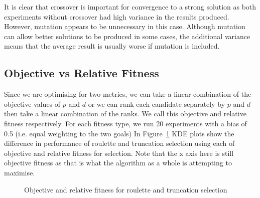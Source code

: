 It is clear that crossover is important for convergence to a strong solution as both experiments without crossover had high variance in the results produced. However, mutation appears to be unnecessary in this case. Although mutation can allow better solutions to be produced in some cases, the additional variance means that the average result is usually worse if mutation is included. 

\subsection{Objective vs Relative Fitness}

Since we are optimising for two metrics, we can take a linear combination of the objective values of $p$ and $d$ or we can rank each candidate separately by $p$ and $d$ then take a linear combination of the ranks. We call this objective and relative fitness respectively. For each fitness type, we run 20 experiments with a bias of 0.5 (i.e. equal weighting to the two goals) In Figure~\ref{fig:objective} KDE plots show the difference in performance of roulette and truncation selection using each of objective and relative fitness for selection. Note that the x axis here is still objective fitness as that is what the algorithm as a whole is attempting to maximise.

\begin{figure}[!h]
\centering
            \hfill
            \hfill
            \caption{Objective and relative fitness for roulette and truncation selection}
\label{fig:objective}
\end{figure}

